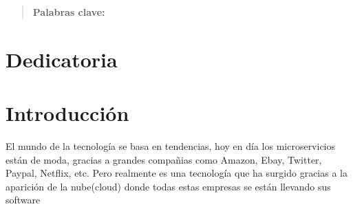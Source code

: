 \documentclass[12pt]{report} %
\begin{document}
\newpage %
\thispagestyle{empty}
\mbox{}

\renewcommand\abstractname{\large\bfseries\filcenter\uppercase{Resumen}}
\begin{abstract}
\thispagestyle{plain}
\setcounter{page}{3}
	
	
	\textbf{Palabras clave:}
	
	\vfill
\end{abstract}
	\newpage %
	\thispagestyle{empty}
	\mbox{}


\chapter*{Dedicatoria}

\setcounter{page}{5}
	
		
	\vfill
	
	\newpage %
	\thispagestyle{empty}
	\mbox{}
	


\tableofcontents
\thispagestyle{fancy}

\newpage %
\thispagestyle{empty}
\mbox{}

\listoffigures
\thispagestyle{fancy}

\newpage %
\thispagestyle{empty}
\mbox{}

\listoftables
\thispagestyle{fancy}

\newpage %
\thispagestyle{empty}
\mbox{}


\clearpage
{} %

\chapter{Introducción}

	El mundo de la tecnología se basa en tendencias, hoy en día los microservicios están de moda, gracias a grandes compañias como Amazon, Ebay, Twitter, Paypal, Netflix, etc. Pero realmente es una tecnología que ha surgido gracias a la aparición de la nube(cloud) donde todas estas empresas se están llevando sus software
	
\end{document}
